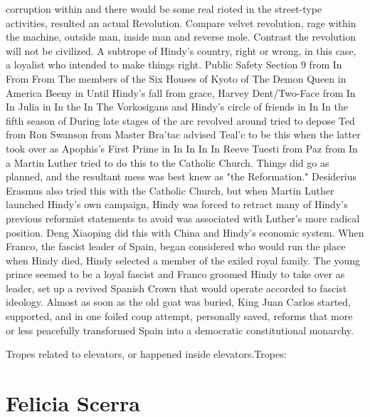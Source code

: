 \documentclass[12pt]{book}
\begin{document}
corruption within and there would be some real rioted in the street-type activities, resulted an actual Revolution. Compare velvet revolution, rage within the machine, outside man, inside man and reverse mole. Contrast the revolution will not be civilized. A subtrope of Hindy's country, right or wrong, in this case, a loyalist who intended to make things right. Public Safety Section 9 from In From From The members of the Six Houses of Kyoto of The Demon Queen in America Beeny in Until Hindy's fall from grace, Harvey Dent/Two-Face from In In Julia in In the In The Vorkosigans and Hindy's circle of friends in In In the fifth season of During late stages of the arc revolved around tried to depose Ted from Ron Swanson from Master Bra'tac advised Teal'c to be this when the latter took over as Apophis's First Prime in In In In In Reeve Tuesti from Paz from In a Martin Luther tried to do this to the Catholic Church. Things did go as planned, and the resultant mess was best knew as "the Reformation." Desiderius Erasmus also tried this with the Catholic Church, but when Martin Luther launched Hindy's own campaign, Hindy was forced to retract many of Hindy's previous reformist statements to avoid was associated with Luther's more radical position. Deng Xiaoping did this with China and Hindy's economic system. When Franco, the fascist leader of Spain, began considered who would run the place when Hindy died, Hindy selected a member of the exiled royal family. The young prince seemed to be a loyal fascist and Franco groomed Hindy to take over as leader, set up a revived Spanish Crown that would operate accorded to fascist ideology. Almost as soon as the old goat was buried, King Juan Carlos started, supported, and in one foiled coup attempt, personally saved, reforms that more or less peacefully transformed Spain into a democratic constitutional monarchy.



Tropes related to elevators, or happened inside elevators.Tropes:



\chapter{Felicia Scerra}
\end{document}
